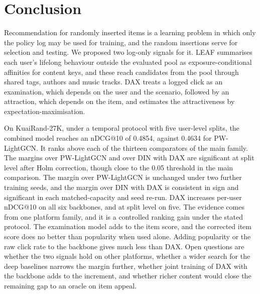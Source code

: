\section{Conclusion}
\label{sec:conclusion}

Recommendation for randomly inserted items is a learning problem in which only the policy log may be used for training, and the random insertions
serve for selection and testing. We proposed two log-only signals for it. LEAF summarises each user's lifelong behaviour outside the evaluated pool as
exposure-conditional affinities for content keys, and these reach candidates from the pool through shared tags, authors and music tracks. DAX treats
a logged click as an examination, which depends on the user and the scenario, followed by an attraction, which depends on the item, and estimates the
attractiveness by expectation-maximisation.

On KuaiRand-27K, under a temporal protocol with five user-level splits, the combined model reaches an nDCG@10 of 0.4854, against 0.4634 for PW-LightGCN.
It ranks above each of the thirteen comparators of the main family. The margins over PW-LightGCN and over DIN with DAX are significant at split level after Holm correction, though close to the 0.05 threshold in the main comparison. The margin over PW-LightGCN is unchanged under two further training seeds, and the margin over DIN with DAX is consistent in sign and significant in each matched-capacity and seed re-run. DAX increases per-user nDCG@10 on all six backbones, and at split level on five. The evidence comes
from one platform family, and it is a controlled ranking gain under the stated protocol. The examination model adds to the item score, and the corrected
item score does no better than popularity when used alone. Adding popularity or the raw click rate to the backbone gives much less than DAX. Open questions are whether the two signals hold on other platforms, whether a wider
search for the deep baselines narrows the margin further, whether joint training of DAX with the backbone adds to the increment, and whether
richer content would close the remaining gap to an oracle on item appeal.
